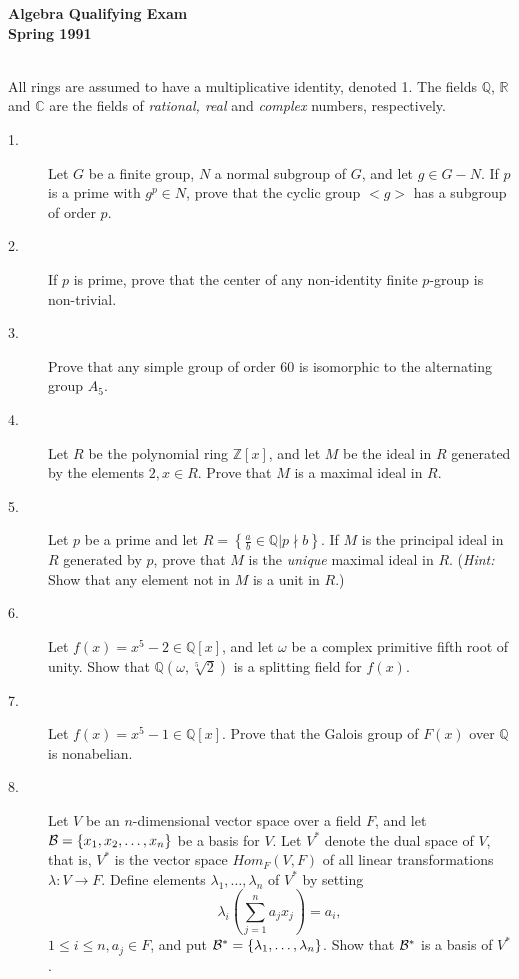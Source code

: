 \documentclass{article}
\def\R{\mathbb R}
\def\C{\mathbb C}
\def\Z{\mathbb Z}
\def\Q{\mathbb Q}
\begin{document}



\begin{center}\begin{LARGE}
{\bf Algebra Qualifying Exam}\\ 
{\bf Spring 1991}\\ \end{LARGE}
\end{center}
\vspace{0.1in}
\noindent\hrulefill\\
All rings are assumed to have a multiplicative identity, denoted 1. The
fields $\Q$, $\R$ and $\C$ are the fields of {\it rational, real} and
{\it complex} numbers, respectively.

\begin{description}

\item[1.]
Let $G$ be a finite group, $N$ a normal subgroup of $G$, and let
$g \in G-N$. If $p$ is a prime with $g^p \in N$, prove that the cyclic
group $<g>$ has a subgroup of order $p$.

\item[2.]
If $p$ is prime, prove that the center of any non-identity finite
$p$-group is non-trivial.

\item[3.]
Prove that any simple group of order 60 is isomorphic to the alternating
group $A_5$.

\item[4.]
Let $R$ be the polynomial ring $\Z[x]$, and let $M$ be the ideal in $R$
generated by the elements $2, x \in R$. Prove that $M$ is a maximal ideal
in $R$.

\item[5.]
Let $p$ be a prime and let $R = \left\{\frac{a}{b} \in \Q | p \nmid b \right\}$.
If $M$ is the principal ideal in $R$ generated by $p$, prove that
$M$ is the {\it unique} maximal ideal in $R$. ({\it Hint:} Show that
any element not in $M$ is a unit in $R$.)

\item[6.]
Let $f(x) = x^5-2 \in \Q[x]$, and let $\omega$ be a complex primitive fifth
root of unity. Show that $\Q(\omega, \sqrt[5]{2})$ is a splitting
field for $f(x)$.

\item[7.]
Let $f(x) = x^5 - 1 \in \Q[x]$. Prove that the Galois group of $F(x)$ over
$\Q$ is nonabelian.

\item[8.]
Let $V$ be an $n$-dimensional vector space over a field $F$, and let
${\cal B} = \{x_1, x_2, \dots, x_n\}$ be a basis for $V$. Let $V^\ast$
denote the dual space of $V$, that is, $V^\ast$ is the vector space
$Hom_F(V,F)$ of all linear transformations $\lambda : V \to F$.
Define elements $\lambda_1, \dots, \lambda_n$ of $V^\ast$ by setting
$$\lambda_i \left( \sum^n_{j=1} a_jx_j \right) = a_i,$$
$1 \leq i \leq n, a_j \in F$, and put
${\cal B}^\ast = \{\lambda_1, \dots, \lambda_n\}$. Show that ${\cal B}^\ast$
is a basis of $V^\ast$.


\end{description}
\end{document}
